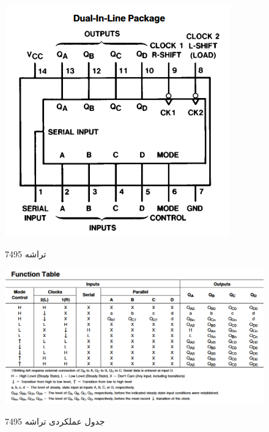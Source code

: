 \documentclass[twoside]{article}
\begin{document}
	
	\begin{figure}[h!]
		\begin{center}
			\includegraphics[scale=0.75]{7495_connection_diagram}‎
			\caption{تراشه 7495}
		\end{center}
	\end{figure} 

	\begin{figure}[h!]
		\begin{center}
			\includegraphics[scale=0.6]{7495_function_table}‎
			\caption{ جدول عملکردی تراشه 7495}
		\end{center}
	\end{figure} 
\end{document}
